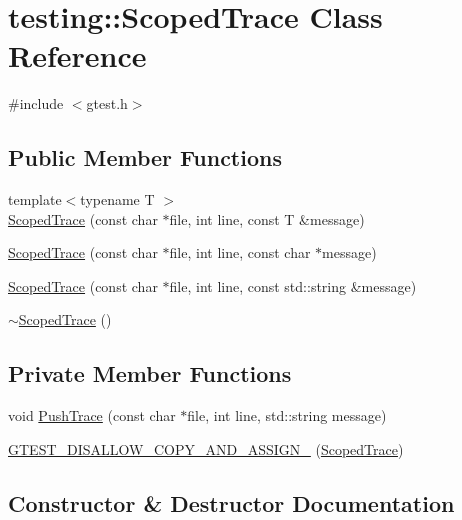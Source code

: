 \hypertarget{classtesting_1_1ScopedTrace}{}\section{testing\+:\+:Scoped\+Trace Class Reference}
\label{classtesting_1_1ScopedTrace}


{\ttfamily \#include $<$gtest.\+h$>$}

\subsection*{Public Member Functions}
\begin{DoxyCompactItemize}
\item 
{\footnotesize template$<$typename T $>$ }\\\hyperlink{classtesting_1_1ScopedTrace_a2da90b95d682d518cca472934d53c59c}{Scoped\+Trace} (const char $\ast$file, int line, const T \&message)
\item 
\hyperlink{classtesting_1_1ScopedTrace_accd2a06cc941ffd7d6fe109adfdb4f19}{Scoped\+Trace} (const char $\ast$file, int line, const char $\ast$message)
\item 
\hyperlink{classtesting_1_1ScopedTrace_a1f453a2aade0db6955a111a7cb329615}{Scoped\+Trace} (const char $\ast$file, int line, const std\+::string \&message)
\item 
\hyperlink{classtesting_1_1ScopedTrace_aa8320ec2679f205cf2c14f508ba35b4d}{$\sim$\+Scoped\+Trace} ()
\end{DoxyCompactItemize}
\subsection*{Private Member Functions}
\begin{DoxyCompactItemize}
\item 
void \hyperlink{classtesting_1_1ScopedTrace_a905304c342012d6ae1493a1ad3b62255}{Push\+Trace} (const char $\ast$file, int line, std\+::string message)
\item 
\hyperlink{classtesting_1_1ScopedTrace_aed447fe36b38f99ace904ed52c206eb0}{G\+T\+E\+S\+T\+\_\+\+D\+I\+S\+A\+L\+L\+O\+W\+\_\+\+C\+O\+P\+Y\+\_\+\+A\+N\+D\+\_\+\+A\+S\+S\+I\+G\+N\+\_\+} (\hyperlink{classtesting_1_1ScopedTrace}{Scoped\+Trace})
\end{DoxyCompactItemize}


\subsection{Constructor \& Destructor Documentation}
\mbox{\label{classtesting_1_1ScopedTrace_a2da90b95d682d518cca472934d53c59c}} 
